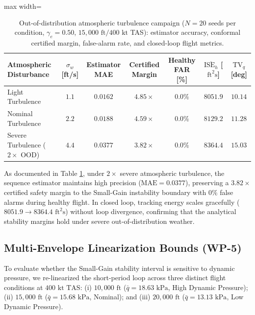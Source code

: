 \documentclass[review,12pt]{elsarticle}
\begin{document}
\begin{table}[!htbp]
\centering
\caption{Out-of-distribution atmospheric turbulence campaign ($N = 20$ seeds per condition, $\gamma_e = 0.50$, $15{,}000\text{ ft} / 400\text{ kt}$ TAS): estimator accuracy, conformal certified margin, false-alarm rate, and closed-loop flight metrics.}
\label{tab:wp2_turbulence}
\scriptsize
\setlength{\tabcolsep}{3pt}
\begin{adjustbox}{max width=\textwidth}
\begin{tabular}{lcccccc}
\toprule
Atmospheric Disturbance & $\sigma_w$ [ft/s] & Estimator MAE & Certified Margin & Healthy FAR [\%] & $\overline{\text{ISE}_h}$ [$\text{ft}^2\text{s}$] & $\text{TV}_q$ [deg] \\
\midrule
Light Turbulence & $1.1$ & $0.0162$ & $\bm{4.85\times}$ & $0.0\%$ & $8051.9$ & $10.14$ \\
Nominal Turbulence & $2.2$ & $0.0188$ & $\bm{4.59\times}$ & $0.0\%$ & $8129.2$ & $11.28$ \\
Severe Turbulence ($2\times$ OOD) & $4.4$ & $0.0377$ & $\bm{3.82\times}$ & $0.0\%$ & $8364.4$ & $15.03$ \\
\bottomrule
\end{tabular}
\end{adjustbox}
\end{table}

As documented in Table \ref{tab:wp2_turbulence}, under $2\times$ severe atmospheric turbulence, the sequence estimator maintains high precision ($\text{MAE} = 0.0377$), preserving a $\bm{3.82\times}$ certified safety margin to the Small-Gain instability boundary with $0\%$ false alarms during healthy flight. In closed loop, tracking energy scales gracefully ($8051.9 \to 8364.4\text{ ft}^2\text{s}$) without loop divergence, confirming that the analytical stability margins hold under severe out-of-distribution weather.

\subsection{Multi-Envelope Linearization Bounds (WP-5)}
\label{sec:wp5_multienvelope}

To evaluate whether the Small-Gain stability interval is sensitive to dynamic pressure, we re-linearized the short-period loop across three distinct flight conditions at $400\text{ kt TAS}$: (i) $10{,}000\text{ ft}$ ($\bar{q} = 18.63\text{ kPa}$, High Dynamic Pressure); (ii) $15{,}000\text{ ft}$ ($\bar{q} = 15.68\text{ kPa}$, Nominal); and (iii) $20{,}000\text{ ft}$ ($\bar{q} = 13.13\text{ kPa}$, Low Dynamic Pressure).
\end{document}
